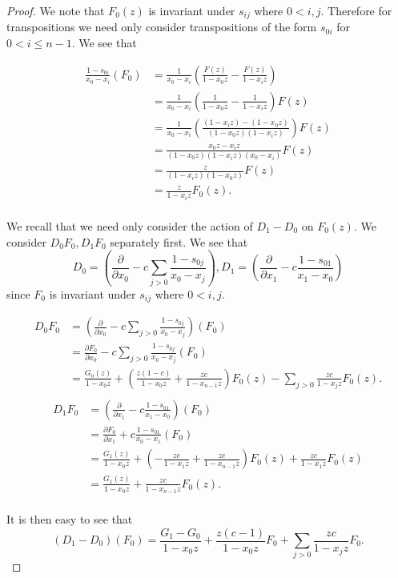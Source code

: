 \documentclass{article}
\numberwithin{equation}{section}
\begin{document}
\begin{proof}
We note that $F_0(z)$ is invariant under $s_{ij}$ where $0 < i,j$. Therefore for transpositions we need only consider transpositions of the form $s_{0i}$ for $0 < i \le n-1$. We see that

\begin{align*}
\frac{1-s_{0i}}{x_0-x_i}(F_0)&=\frac{1}{x_0-x_i}\left(\frac{F(z)}{1-x_0z}-\frac{F(z)}{1-x_iz}\right)\\
&=\frac{1}{x_0-x_i}\left(\frac{1}{1-x_0z}-\frac{1}{1-x_iz}\right)F(z)\\
&=\frac{1}{x_0-x_i}\left(\frac{(1-x_iz)-(1-x_0z)}{(1-x_0z)(1-x_iz)}\right)F(z)\\
&=\frac{x_0z-x_iz}{(1-x_0z)(1-x_iz)(x_0-x_i)}F(z)\\
&=\frac{z}{(1-x_iz)(1-x_0z)}F(z)\\
&=\frac{z}{1-x_iz}F_0(z).\\
\end{align*}


We recall that we need only consider the action of $D_1-D_0$ on $F_0(z)$. We consider $D_0F_0, D_1F_0$ separately first. We see that $$D_0=\left(\frac{\partial}{\partial x_0}-c\sum_{j > 0} \frac{1-s_{0j}}{x_0-x_j}\right), D_1=\left(\frac{\partial}{\partial x_1}-c \frac{1-s_{01}}{x_1-x_0}\right)$$ since $F_0$ is invariant under $s_{ij}$ where $0 < i,j$. 

\begin{align*}
D_0F_0&=\left(\frac{\partial}{\partial x_0}-c\sum_{j > 0} \frac{1-s_{0j}}{x_0-x_j}\right)(F_0)\\
&=\frac{\partial F_0}{\partial x_0}-c\sum_{j > 0} \frac{1-s_{0j}}{x_0-x_j}(F_0)\\
&=\frac{G_0(z)}{1-x_0z}+\left(\frac{z(1-c)}{1-x_0z}+\frac{zc}{1-x_{n-1}z}\right)F_0(z)-\sum_{j > 0} \frac{zc}{1-x_jz}F_0(z).\\
\end{align*}
\begin{align*}
D_1F_0&=\left(\frac{\partial}{\partial x_1}-c \frac{1-s_{01}}{x_1-x_0}\right)(F_0)\\
&=\frac{\partial F_0}{\partial x_1}+c \frac{1-s_{01}}{x_0-x_1}(F_0)\\
&=\frac{G_1(z)}{1-x_0z}+\left(-\frac{zc}{1-x_1z}+\frac{zc}{1-x_{n-1}z}\right)F_0(z)+\frac{zc}{1-x_1z}F_0(z)\\
&=\frac{G_1(z)}{1-x_0z}+\frac{zc}{1-x_{n-1}z}F_0(z).\\
\end{align*}

It is then easy to see that $$(D_1-D_0)(F_0)=\frac{G_1-G_0}{1-x_0z}+\frac{z(c-1)}{1-x_0z}F_0+\sum_{j>0} \frac{zc}{1-x_jz}F_0.$$


\end{proof}
\end{document}
